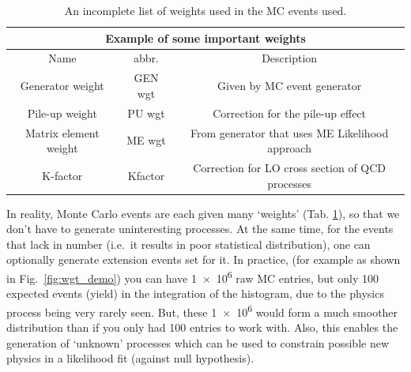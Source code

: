 \begin{table}[ht]
\centering
\begin{tabular}{|c|c|c|}
\hline
\multicolumn{3}{|c|}{Example of some important weights}                                                                                       \\ \hline
Name                  & abbr.   & Description                                                                                                 \\ \hline
Generator weight      & GEN wgt & Given by MC event generator                                                                                 \\ \hline
Pile-up weight        & PU wgt  & Correction for the pile-up effect\footnotemark                                                                           \\ \hline
Matrix element weight & ME wgt  & From generator that uses ME Likelihood approach \\ \hline
K-factor              & Kfactor & Correction for LO cross section of QCD processes                                                         \\ \hline
\end{tabular}
\caption{An incomplete list of weights used in the MC events used.}
\label{tab:MC_wgts}
\end{table}

In reality, Monte Carlo events are each given many `weights' (Tab. \ref{tab:MC_wgts}), so that
we don't have to generate uninteresting processes. At the same time, for the events that lack
in number (i.e.\ it results in poor statistical distribution), one can optionally generate
extension events set for it. In practice, (for example as shown in Fig.~\ref{fig:wgt_demo})
you can have \num{1e6} raw MC entries, but only
100 expected events (yield) in the integration of the histogram, 
due to the physics process being very rarely seen. But,
these \num{1e6} would form a much smoother distribution than if you only had 100 entries to work with.
Also, this enables the generation of `unknown' processes which can
be used to constrain possible new physics in a likelihood fit (against null hypothesis).

